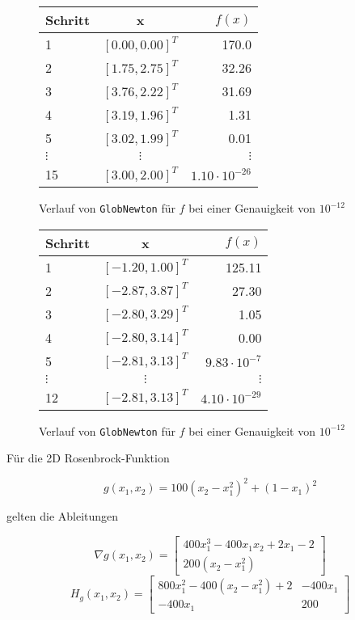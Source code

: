 \documentclass[a4paper, 12pt]{report}
\begin{document}
\begin{figure}[H]
  \centering
  \def\arraystretch{1.25}
  \begin{tabular}{l|c|r}
    \hline
    \textbf{Schritt} & \textbf{x} & \textbf{$f(x)$}\\
    \hline
    1 & $[0.00, 0.00]^T$ & 170.0\\
    2 & $[1.75, 2.75]^T$ & 32.26\\
    3 & $[3.76, 2.22]^T$ & 31.69\\
    4 & $[3.19, 1.96]^T$ & 1.31\\
    5 & $[3.02, 1.99]^T$ & 0.01\\
    $\vdots$ & $\vdots$ & $\vdots$\\
    15 & $[3.00, 2.00]^T$ & $1.10 \cdot 10^{-26}$\\
    \hline
  \end{tabular}
  \caption{Verlauf von \lstinline[basicstyle=\ttfamily\color{black}]|GlobNewton| für $f$ bei einer Genauigkeit von $10^{-12}$}
  \label{convHimmel1}
\end{figure}

\begin{figure}[H]
  \centering
  \def\arraystretch{1.25}
  \begin{tabular}{l|c|r}
    \hline
    \textbf{Schritt} & \textbf{x} & \textbf{$f(x)$}\\
    \hline
    1 & $[-1.20, 1.00]^T$ & 125.11\\
    2 & $[-2.87, 3.87]^T$ & 27.30\\
    3 & $[-2.80, 3.29]^T$ & 1.05\\
    4 & $[-2.80, 3.14]^T$ & 0.00\\
    5 & $[-2.81, 3.13]^T$ & $9.83 \cdot 10^{-7}$\\
    $\vdots$ & $\vdots$ & $\vdots$\\
    12 & $[-2.81, 3.13]^T$ & $4.10 \cdot 10^{-29}$\\
    \hline
  \end{tabular}
  \caption{Verlauf von \lstinline[basicstyle=\ttfamily\color{black}]|GlobNewton| für $f$ bei einer Genauigkeit von $10^{-12}$}
  \label{convHimmel2}
\end{figure}

Für die 2D Rosenbrock-Funktion

$$ g(x_1, x_2) = 100(x_2 - x_1^2)^2 + (1 - x_1)^2 $$

gelten die Ableitungen

$$ \nabla g(x_1, x_2) = \begin{bmatrix} 400x_1^3 - 400x_1x_2 + 2x_1 - 2\\200(x_2 - x_1^2)\end{bmatrix} $$
$$ H_g(x_1, x_2) = \begin{bmatrix} 800x_1^2 - 400(x_2-x_1^2) + 2 & -400x_1\\-400x_1 & 200 \end{bmatrix} $$
\end{document}
